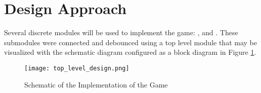 \documentclass[paper=usletter, fontsize=12pt]{article}
\begin{document}
    \section{Design Approach}
    Several discrete modules will be used to implement the game: ,  and . These submodules were connected and debounced using a top level module that may be visualized with the schematic diagram configured as a block diagram in Figure \ref{fig:schematic}.

    \begin{figure}[ht]
        \begin{center}
            \texttt{[image: top\_level\_design.png]}
            \caption{Schematic of the Implementation of the Game} \label{fig:schematic}
        \end{center}
    \end{figure}
    \newpage




\end{document}
